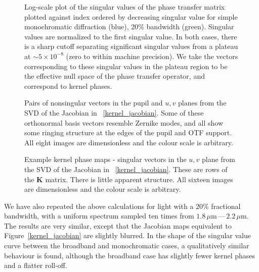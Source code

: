 \documentclass[modern]{aastex63}
\begin{document}
\begin{figure}
     \caption{Log-scale plot of the singular values of the phase transfer matrix plotted against index ordered by decreasing singular value for simple monochromatic diffraction (blue), 20\% bandwidth (green). Singular values are normalized to the first singular value. In both cases, there is a sharp cutoff separating significant singular values from a plateau at $\sim 5 \times10^{-8}$ (zero to within machine precision). We take the vectors corresponding to these singular values in the plateau region to be the effective null space of the phase transfer operator, and correspond to kernel phases. \href{https://github.com/benjaminpope/morphine/blob/stable/notebooks/morphine_uv.ipynb}{\color{linkcolor}\faGithub}}
    \label{fig:svd}
\end{figure}

\begin{figure}
\caption{Pairs of nonsingular vectors in the pupil and $u,v$ planes from the SVD of the Jacobian in ~\ref{kernel_jacobian}. Some of these orthonormal basis vectors resemble Zernike modes, and all show some ringing structure at the edges of the pupil and OTF support. All eight images are dimensionless and the colour scale is arbitrary. \href{https://github.com/benjaminpope/morphine/blob/stable/notebooks/morphine_uv.ipynb}{\color{linkcolor}\faGithub}
\label{nonsingular_modes}}
\end{figure}

\begin{figure}
\caption{Example kernel phase maps - singular vectors in the $u,v$ plane from the SVD of the Jacobian in ~\ref{kernel_jacobian}. These are rows of the $\mathbf{K}$ matrix. There is little apparent structure. All sixteen images are dimensionless and the colour scale is arbitrary. \href{https://github.com/benjaminpope/morphine/blob/stable/notebooks/morphine_uv.ipynb}{\color{linkcolor}\faGithub}
\label{kernel_modes}}
\end{figure}

We have also repeated the above calculations for light with a $20\%$ fractional bandwidth, with a uniform spectrum sampled ten times from $1.8\,\mu\text{m}$\,---\,$2.2\,\mu\text{m}$. The results are very similar, except that the Jacobian maps equivalent to Figure~\ref{kernel_jacobian} are slightly blurred. In the shape of the singular value curve between the broadband and monochromatic cases, a qualitatively similar behaviour is found, although the broadband case has slightly fewer kernel phases and a flatter roll-off.
\end{document}
